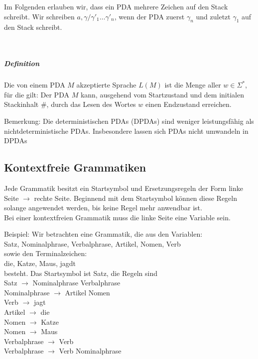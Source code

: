\documentclass[a4paper]{scrartcl}
\begin{document}
Im Folgenden erlauben wir, dass ein PDA mehrere Zeichen auf den Stack schreibt. Wir schreiben $a,\gamma/\gamma'_1 \dots \gamma'_n$, wenn der PDA zuerst $\gamma_n$ und zuletzt $\gamma_1$ auf den Stack schreibt.\\
\\

\subparagraph{Definition} Die von einem PDA $M$ akzeptierte Sprache $L(M)$ ist die Menge aller $w \in \Sigma^*$, für die gilt: Der PDA $M$ kann, ausgehend vom Startzustand und dem initialen Stackinhalt $\#$, durch das Lesen des Wortes $w$ einen Endzustand erreichen.

Bemerkung: Die deterministischen PDAs (DPDAs) sind weniger leistungsfähig als nichtdeterministische PDAs. Insbesondere lassen sich PDAs nicht umwandeln in DPDAs

\subsection{Kontextfreie Grammatiken}
Jede Grammatik besitzt ein Startsymbol und Ersetzungsregeln der Form linke Seite $\rightarrow$ rechte Seite. Beginnend mit dem Startsymbol können diese Regeln solange angewendet werden, bis keine Regel mehr anwendbar ist.\\
Bei einer kontextfreien Grammatik muss die linke Seite eine Variable sein.

Beispiel: Wir betrachten eine Grammatik, die aus den Variablen:\\
Satz, Nominalphrase, Verbalphrase, Artikel, Nomen, Verb\\
sowie den Terminalzeichen:\\
die, Katze, Maus, jagdt\\
besteht. Das Startsymbol ist Satz, die Regeln sind\\
Satz $\rightarrow$ Nominalphrase Verbalphrase\\
Nominalphrase $\rightarrow$ Artikel Nomen\\
Verb $\rightarrow$ jagt\\
Artikel $\rightarrow$ die\\
Nomen $\rightarrow$ Katze\\
Nomen $\rightarrow$ Maus\\
Verbalphrase $\rightarrow$ Verb\\
Verbalphrase $\rightarrow$ Verb Nominalphrase\\
\end{document}
